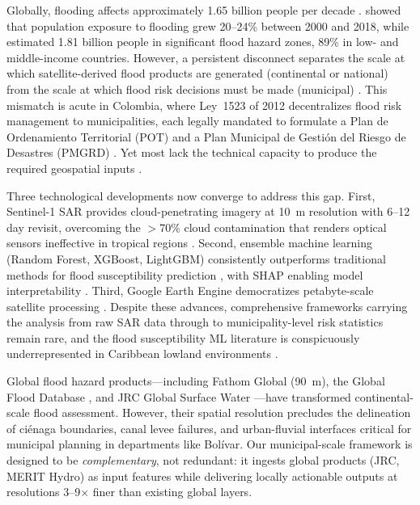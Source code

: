 \documentclass{article}
\begin{document}
Globally, flooding affects approximately 1.65 billion people per decade \citep{UNDRR2020}. \citet{Tellman2021} showed that population exposure to flooding grew 20--24\% between 2000 and 2018, while \citet{Rentschler2022} estimated 1.81 billion people in significant flood hazard zones, 89\% in low- and middle-income countries. However, a persistent disconnect separates the scale at which satellite-derived flood products are generated (continental or national) from the scale at which flood risk decisions must be made (municipal) \citep{Bates2023}. This mismatch is acute in Colombia, where Ley~1523 of 2012 decentralizes flood risk management to municipalities, each legally mandated to formulate a Plan de Ordenamiento Territorial (POT) and a Plan Municipal de Gesti\'on del Riesgo de Desastres (PMGRD) \citep{CongresoCol2012}. Yet most lack the technical capacity to produce the required geospatial inputs \citep{OECD2019}.

Three technological developments now converge to address this gap. First, Sentinel-1 SAR provides cloud-penetrating imagery at \SI{10}{\metre} resolution with 6--12 day revisit, overcoming the $>$70\% cloud contamination that renders optical sensors ineffective in tropical regions \citep{Twele2016, DeVries2020}. Second, ensemble machine learning (Random Forest, XGBoost, LightGBM) consistently outperforms traditional methods for flood susceptibility prediction \citep{Mosavi2018, Darabi2021}, with SHAP enabling model interpretability \citep{Lundberg2017}. Third, Google Earth Engine democratizes petabyte-scale satellite processing \citep{Gorelick2017}. Despite these advances, comprehensive frameworks carrying the analysis from raw SAR data through to municipality-level risk statistics remain rare, and the flood susceptibility ML literature is conspicuously underrepresented in Caribbean lowland environments \citep{FloodRiskLAC2022}.

Global flood hazard products---including Fathom Global (\SI{90}{\metre}), the Global Flood Database \citep{Tellman2021}, and JRC Global Surface Water \citep{Pekel2016}---have transformed continental-scale flood assessment. However, their spatial resolution precludes the delineation of ci\'enaga boundaries, canal levee failures, and urban-fluvial interfaces critical for municipal planning in departments like Bol\'ivar. Our municipal-scale framework is designed to be \textit{complementary}, not redundant: it ingests global products (JRC, MERIT Hydro) as input features while delivering locally actionable outputs at resolutions 3--9$\times$ finer than existing global layers.
\end{document}
